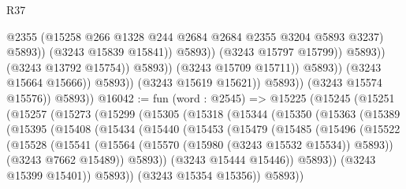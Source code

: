 \begin{lexlean}{R37}
\begin{coremodule}
                                                  @2355
                                                  (@15258
                                                    @266
                                                    @1328
                                                    @244
                                                    @2684
                                                    @2684
                                                    @2355
                                                    @3204
                                                    @5893
                                                    @3237)
                                                  @5893))
                                              (@3243 @15839 @15841))
                                            @5893))
                                        (@3243 @15797 @15799))
                                      @5893))
                                  (@3243 @13792 @15754))
                                @5893))
                            (@3243 @15709 @15711))
                          @5893))
                      (@3243 @15664 @15666))
                    @5893))
                (@3243 @15619 @15621))
              @5893))
          (@3243 @15574 @15576))
        @5893))
@16042 := fun (word : @2545) =>
  @15225
    (@15245
      (@15251
        (@15257
          (@15273
            (@15299
              (@15305
                (@15318
                  (@15344
                    (@15350
                      (@15363
                        (@15389
                          (@15395
                            (@15408
                              (@15434
                                (@15440
                                  (@15453
                                    (@15479
                                      (@15485
                                        (@15496
                                          (@15522
                                            (@15528
                                              (@15541
                                                (@15564
                                                  (@15570 (@15980 (@3243 @15532 @15534)) @5893))
                                                (@3243 @7662 @15489))
                                              @5893))
                                          (@3243 @15444 @15446))
                                        @5893))
                                    (@3243 @15399 @15401))
                                  @5893))
                              (@3243 @15354 @15356))
                            @5893))

\end{coremodule}
\end{lexlean}
